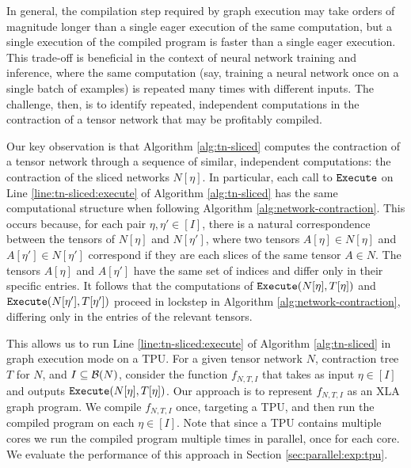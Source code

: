 In general, the compilation step required by graph execution may take orders of magnitude longer than a single eager execution of the same computation, but a single execution of the compiled program is faster than a single eager execution. 
This trade-off is beneficial in the context of neural network training and inference, where the same computation (say, training a neural network once on a single batch of examples) is repeated many times with different inputs.
The challenge, then, is to identify repeated, independent computations in the contraction of a tensor network that may be profitably compiled.

Our key observation is that Algorithm \ref{alg:tn-sliced} computes the contraction of a tensor network through a sequence of similar, independent computations: the contraction of the sliced networks $N[\eta]$. In particular, each call to $\texttt{\upshape Execute}$ on Line \ref{line:tn-sliced:execute} of Algorithm \ref{alg:tn-sliced} has the same computational structure when following Algorithm \ref{alg:network-contraction}. This occurs because, for each pair $\eta, \eta' \in [I]$, there is a natural correspondence between the tensors of $N[\eta]$ and $N[\eta']$, where two tensors $A[\eta] \in N[\eta]$ and $A[\eta'] \in N[\eta']$ correspond if they are each slices of the same tensor $A \in N$. The tensors $A[\eta]$ and $A[\eta']$ have the same set of indices and differ only in their specific entries.
It follows that the computations of $\texttt{\upshape Execute}(N[\eta], T[\eta])$ and $\texttt{\upshape Execute}(N[\eta'], T[\eta'])$ proceed in lockstep in Algorithm \ref{alg:network-contraction}, differing only in the entries of the relevant tensors.

This allows us to run Line \ref{line:tn-sliced:execute} of Algorithm \ref{alg:tn-sliced} in graph execution mode on a TPU.
For a given tensor network $N$, contraction tree $T$ for $N$, and $I \subseteq \mathcal{B}(N)$, consider the function $f_{N,T,I}$ that takes as input $\eta \in [I]$ and outputs $\texttt{\upshape Execute}(N[\eta], T[\eta])$.
Our approach is to represent $f_{N,T,I}$ as an XLA graph program.
We compile $f_{N,T,I}$ once, targeting a TPU, and then run the compiled program on each $\eta \in [I]$.
Note that since a TPU contains multiple cores we run the compiled program multiple times in parallel, once for each core.
We evaluate the performance of this approach in Section \ref{sec:parallel:exp:tpu}.

